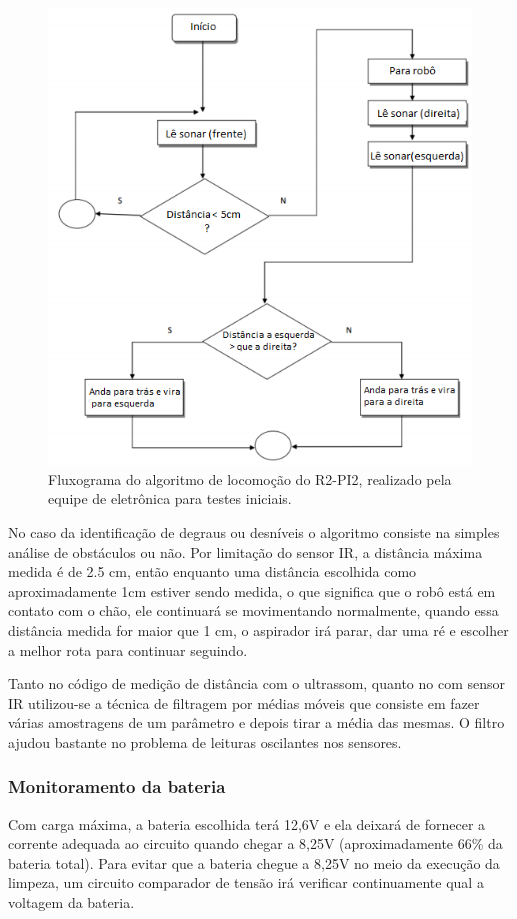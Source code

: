		\begin{figure}[H]
			\centering
			\includegraphics[scale=0.8]{figuras/fluxograma_eletronica.png}
			\caption{Fluxograma do algoritmo de locomoção do R2-PI2, realizado pela equipe de eletrônica para testes iniciais.}
			\label{img:fluxograma_eletronica}
		\end{figure}

		No caso da identificação de degraus ou desníveis o algoritmo consiste na simples análise de obstáculos ou não. Por limitação do sensor IR, a distância máxima medida é de 2.5 cm, então enquanto uma distância escolhida como aproximadamente 1cm estiver sendo medida, o que significa que o robô está em contato com o chão, ele continuará se movimentando normalmente, quando essa distância medida for maior que 1 cm, o aspirador irá parar, dar uma ré e escolher a melhor rota para continuar seguindo.

		Tanto no código de medição de distância com o ultrassom, quanto no com sensor IR utilizou-se a técnica de filtragem por médias móveis que consiste em fazer várias amostragens de um parâmetro e depois tirar a média das mesmas. O filtro ajudou bastante no problema de leituras oscilantes nos sensores. 

		\subsubsection{Monitoramento da bateria}
		\label{sub:Monitoramento_da_bateria}
		Com carga máxima, a bateria escolhida terá 12,6V e ela deixará de fornecer a corrente adequada ao circuito quando chegar a 8,25V (aproximadamente 66\% da bateria total). Para evitar que a bateria chegue a 8,25V no meio da execução da limpeza, um circuito comparador de tensão irá verificar continuamente qual a voltagem da bateria.

